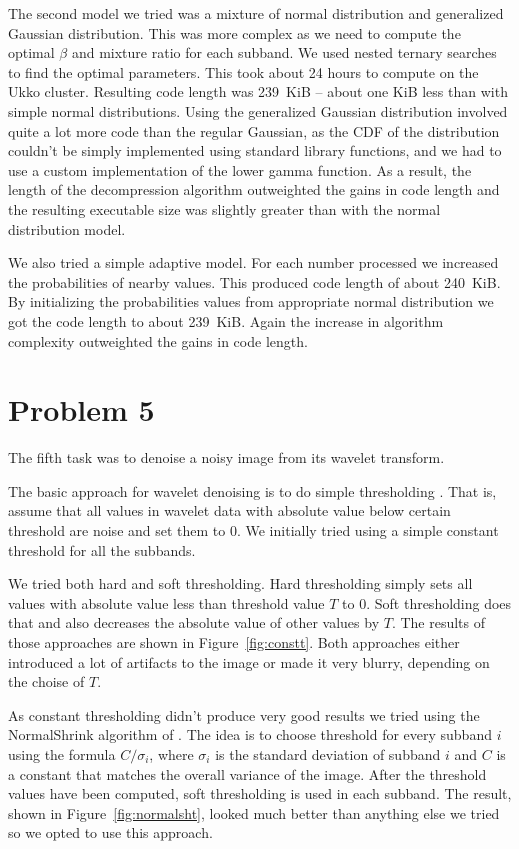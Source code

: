 \documentclass{article}
\begin{document}
The second model we tried was a mixture of normal distribution and generalized Gaussian distribution. This was more complex
as we need to compute the optimal $\beta$ and mixture ratio for each subband. We used nested ternary searches to find the optimal parameters.
This took about 24 hours to compute on the Ukko cluster. Resulting code length was 239~KiB -- about one KiB less than with simple normal distributions.
Using the generalized Gaussian distribution involved quite a lot more code than the regular Gaussian, as the CDF of the distribution couldn't be simply implemented using standard library functions, and we had to use a custom implementation of the lower gamma function.
As a result, the length of the decompression algorithm outweighted the gains in code length and the resulting executable size was slightly
greater than with the normal distribution model.

We also tried a simple adaptive model.
For each number processed we increased the probabilities of nearby values.
This produced code length of about 240~KiB.
By initializing the probabilities values from appropriate normal distribution we got the code length to about 239~KiB.
Again the increase in algorithm complexity outweighted the gains in code length.

\section{Problem 5}

The fifth task was to denoise a noisy image from its wavelet transform.

The basic approach for wavelet denoising is to do simple thresholding \cite{rvs02}. That is, assume that all values in wavelet data with absolute value below certain threshold are noise and set them to 0. We initially tried using a simple constant threshold for all the subbands.

We tried both hard and soft thresholding. Hard thresholding simply sets all values with absolute value less than threshold value $T$ to 0. Soft thresholding does that and also decreases the absolute value of other values by $T$. The results of those approaches are shown in Figure~\ref{fig:constt}. Both approaches either introduced a lot of artifacts to the image or made it very blurry, depending on the choise of $T$.

As constant thresholding didn't produce very good results we tried using the NormalShrink algorithm of \cite{ksc02}. The idea is to choose threshold for every subband $i$ using the formula $C/\sigma_i$, where $\sigma_i$ is the standard deviation of subband $i$ and $C$ is a constant that matches the overall variance of the image. After the threshold values have been computed, soft thresholding is used in each subband. The result, shown in Figure~\ref{fig:normalsht}, looked much better than anything else we tried so we opted to use this approach.
\end{document}
